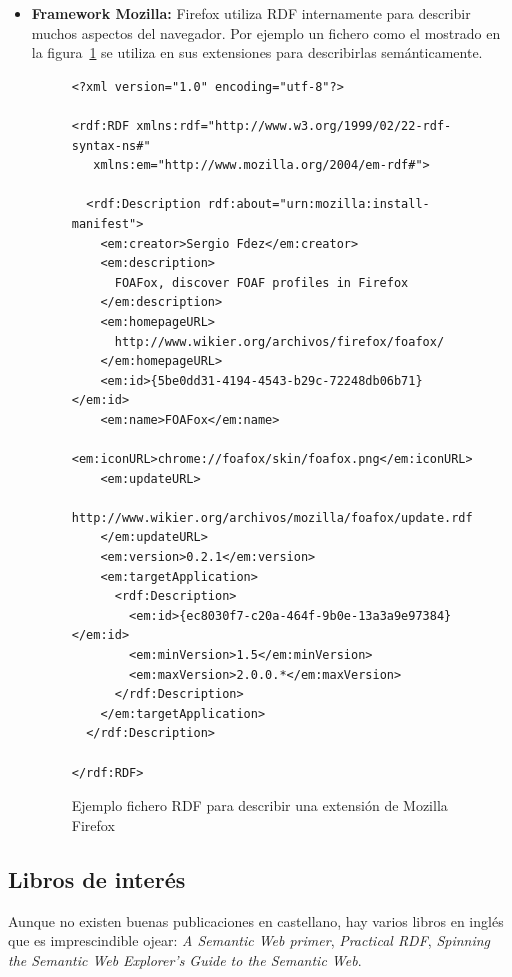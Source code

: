 \begin{itemize}
  \item \textbf{Framework Mozilla:} Firefox utiliza RDF internamente para 
	describir muchos aspectos del navegador. Por ejemplo un fichero como 
	el mostrado en la figura~\ref{fig:rdf.firefox} se utiliza en sus
	extensiones para describirlas semánticamente.

\begin{figure}[H]
\lstset{language=RDF}
\begin{lstlisting}
<?xml version="1.0" encoding="utf-8"?>

<rdf:RDF xmlns:rdf="http://www.w3.org/1999/02/22-rdf-syntax-ns#"
   xmlns:em="http://www.mozilla.org/2004/em-rdf#">

  <rdf:Description rdf:about="urn:mozilla:install-manifest">
    <em:creator>Sergio Fdez</em:creator>
    <em:description>
      FOAFox, discover FOAF profiles in Firefox
    </em:description>
    <em:homepageURL>
      http://www.wikier.org/archivos/firefox/foafox/
    </em:homepageURL>
    <em:id>{5be0dd31-4194-4543-b29c-72248db06b71}</em:id>
    <em:name>FOAFox</em:name>
    <em:iconURL>chrome://foafox/skin/foafox.png</em:iconURL>
    <em:updateURL>
      http://www.wikier.org/archivos/mozilla/foafox/update.rdf
    </em:updateURL>
    <em:version>0.2.1</em:version>
    <em:targetApplication>
      <rdf:Description>
        <em:id>{ec8030f7-c20a-464f-9b0e-13a3a9e97384}</em:id>
        <em:minVersion>1.5</em:minVersion>
        <em:maxVersion>2.0.0.*</em:maxVersion>
      </rdf:Description>
    </em:targetApplication>
  </rdf:Description>

</rdf:RDF>
\end{lstlisting}
\caption{Ejemplo fichero RDF para describir una extensión de Mozilla Firefox}
\label{fig:rdf.firefox}
\end{figure}

\end{itemize}

\subsection{Libros de interés}

Aunque no existen buenas publicaciones en castellano, hay varios libros en inglés 
que es imprescindible ojear: \emph{A Semantic Web primer}\cite{SemanticWebPrimer},
\emph{Practical RDF}\cite{PracticalRDF}, 
\emph{Spinning the Semantic Web}\cite{SpinningSemanticWeb}
\emph{Explorer's Guide to the Semantic Web}\cite{ExplorerSemanticWeb}.


